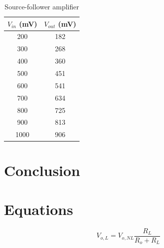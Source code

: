 \begin{table}[hbtp]
  \centering
  \begin{tabular}{cc}
    $V_{in}$ (\si{mV}) & $V_{out}$ (\si{mV}) \\
    \hline
    200                & 182                 \\
    300                & 268                 \\
    400                & 360                 \\
    500                & 451                 \\
    600                & 541                 \\
    700                & 634                 \\
    800                & 725                 \\
    900                & 813                 \\
    1000               & 906                 \\
  \end{tabular}
  \caption{\label{tab:source-follower} Source-follower amplifier}
\end{table}



\section{Conclusion}
\label{sec:conclusion}


\section{Equations}
\label{sec:equations}

%
\begin{equation}
  \label{eq:amp}
  V_{o,L} = V_{o,NL} \frac{R_L}{R_o + R_L}
\end{equation}
%


